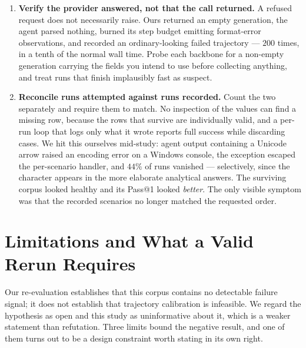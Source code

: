 \documentclass[conference]{IEEEtran}
\begin{document}
\begin{enumerate}
  that carry the column are also the rows that succeed: a model handed that
  column then separates the classes by detecting its own availability, and the
  imputation filling the gap becomes the discriminative signal. Compare the
  outcome rate on rows that have the column against those that do not, and
  report what share of the positives sits inside each group. We were caught by
  this in the corrected pipeline, not the original one: token features survived
  on $25$ of $225$ trajectories and every success lay inside those $25$, so
  every family scored above $0.9$ AUROC while measuring only which runs had
  been collected successfully.
  \item \textbf{Verify the provider answered, not that the call returned.} A
  refused request does not necessarily raise. Ours returned an empty generation,
  the agent parsed nothing, burned its step budget emitting format-error
  observations, and recorded an ordinary-looking failed trajectory --- $200$
  times, in a tenth of the normal wall time. Probe each backbone for a
  non-empty generation carrying the fields you intend to use before collecting
  anything, and treat runs that finish implausibly fast as suspect.
  \item \textbf{Reconcile runs attempted against runs recorded.} Count the two
  separately and require them to match. No inspection of the values can find a
  missing row, because the rows that survive are individually valid, and a
  per-run loop that logs only what it wrote reports full success while
  discarding cases. We hit this ourselves mid-study: agent output containing a
  Unicode arrow raised an encoding error on a Windows console, the exception
  escaped the per-scenario handler, and $44\%$ of runs vanished --- selectively,
  since the character appears in the more elaborate analytical answers. The
  surviving corpus looked healthy and its Pass@1 looked \emph{better}. The only
  visible symptom was that the recorded scenarios no longer matched the
  requested order.
\end{enumerate}

\section{Limitations and What a Valid Rerun Requires}
\label{sec:limitations}

Our re-evaluation establishes that this corpus contains no detectable failure
signal; it does not establish that trajectory calibration is infeasible. We
regard the hypothesis as open and this study as uninformative about it, which is
a weaker statement than refutation. Three limits bound the negative result, and
one of them turns out to be a design constraint worth stating in its own right.
\end{document}
